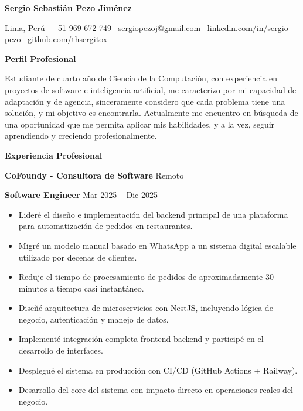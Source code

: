 \documentclass[11pt]{article}
\begin{document}
\begin{center}
\textbf{\Large Sergio Sebastián Pezo Jiménez}\\
\hrulefill
\end{center}

\begin{center}
Lima, Perú \textbullet\ +51 969 672 749 \textbullet\ sergiopezoj@gmail.com \textbullet\ linkedin.com/in/sergio-pezo \textbullet\ github.com/thsergitox
\end{center}

\vspace{4pt}

\begin{center}
\textbf{Perfil Profesional}
\end{center}

Estudiante de cuarto año de Ciencia de la Computación, con experiencia en proyectos de software e inteligencia artificial, me caracterizo por mi capacidad de adaptación y de agencia, sinceramente considero que cada problema tiene una solución, y mi objetivo es encontrarla. Actualmente me encuentro en búsqueda de una oportunidad que me permita aplicar mis habilidades, y a la vez, seguir aprendiendo y creciendo profesionalmente.

\vspace{10pt}

\begin{center}
\textbf{Experiencia Profesional}
\end{center}

\textbf{CoFoundy - Consultora de Software} \hfill Remoto

\textbf{Software Engineer} \hfill Mar 2025 – Dic 2025 

\begin{itemize}[noitemsep]
\item Lideré el diseño e implementación del backend principal de una plataforma para automatización de pedidos en restaurantes.
\item Migré un modelo manual basado en WhatsApp a un sistema digital escalable utilizado por decenas de clientes.
\item Reduje el tiempo de procesamiento de pedidos de aproximadamente 30 minutos a tiempo casi instantáneo.
\item Diseñé arquitectura de microservicios con NestJS, incluyendo lógica de negocio, autenticación y manejo de datos.
\item Implementé integración completa frontend-backend y participé en el desarrollo de interfaces.
\item Desplegué el sistema en producción con CI/CD (GitHub Actions + Railway).
\item Desarrollo del core del sistema con impacto directo en operaciones reales del negocio.
\end{itemize}
\end{document}
